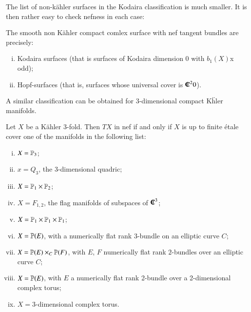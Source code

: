 The list of non-k\"ahler surfaces in the Kodaira classification is much smaller. It is then rather easy to check nefness in each case:

\begin{theorem}\label{art5-thm-4.2}
The smooth non K\"ahler compact comlex surface with nef tangent bundles are precisely:
    \begin{enumerate}[(i)]
        \item Kodaira surfaces (that is surfaces of Kodaira dimension 0 with $b_{1}(X)$x
        odd);\label{art5-enum-thm(4.2)-(i)}
       \item Hopf-surfaces (that is, surfaces whose universal cover is $\IC^{2}{0}$).\label{art5-enum-thm(4.2)-(ii)} 
    \end{enumerate}
\end{theorem}

A similar classification can be obtained for 3-dimensional compact K\"hler manifolds.

\setcounter{section}{7}
\setcounter{prop}{0}
\begin{theorem}\label{art5-thm-7.1}
Let $X$ be a K\"ahler 3-fold. Then $TX$ in nef if and only if $X$ is up to finite \'etale cover one of the manifolds in the following list:
 \begin{enumerate}[(i)]
    \item $X = \mathbb{P}_{3}$;\label{art5-enum-thm7.1-(i)}
    \item $x = Q_{3}$, the 3-dimensional quadric;\label{art5-enum-thm7.1-(ii)}
    \item $X= \mathbb{P}_{1} \times \mathbb{P}_{2}$;\label{art5-enum-thm7.1-(iii)}
    \item $X = F_{1,2}$, the flag manifolds of subspaces of $\IC^{3}$;\label{art5-enum-thm7.1-(iv)}
    \item  $X= \mathbb{P}_{1} \times \mathbb{P}_{1} \times \mathbb{P}_{1}$;\label{art5-enum-thm7.1-(v)}
    \item $X = \mathbb{P}(E)$, with a numerically flat rank 3-bundle on an elliptic curve $C$;\label{art5-enum-thm7.1-(vi)}
    \item $X= \mathbb{P}(E)\times _{C}\mathbb{P}(F)$, with $E$, $F$ numerically flat rank $2$-bundles over an elliptic curve $C$;\label{art5-enum-thm7.1-(vii)}
    \item $X= \mathbb{P}(E)$, with $E$ a numerically flat rank 2-bundle over a 2-dimensional complex torus;\label{art5-enum-thm7.1-(viii)}
    \item $X= 3$-dimensional complex torus. \label{art5-enum-thm7.1-(ix)}
 \end{enumerate}
\end{theorem}

